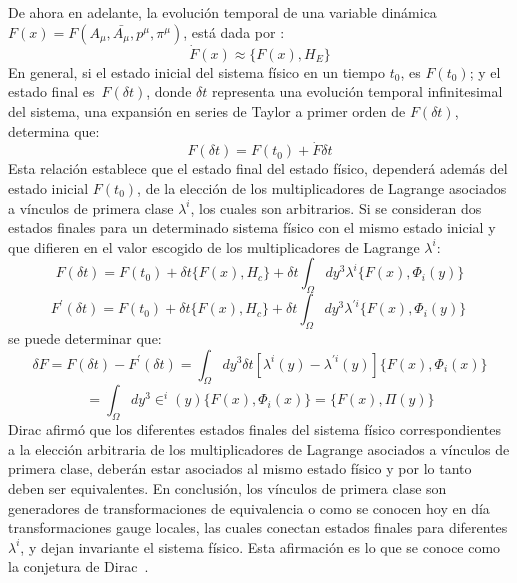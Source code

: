\documentclass[a4paper,12pt]{article}
\begin{document}
De ahora en adelante, la evolución temporal de una variable dinámica \mbox{$F(x)=F(A_\mu,\bar{A_\mu},p^\mu,\pi^\mu)$}, está dada por \cite{dirac,puebla,Merilin}:
\begin{equation}
\dot F(x)\approx\{F(x),H_E\} 
\label{haex}
\end{equation}
En general, si el estado inicial del sistema físico en un tiempo $t_0$, es $F(t_0)$; y el estado final \mbox{es $F(\delta t)$}, donde $\delta t$ representa una evolución temporal infinitesimal del sistema, una expansión en series de Taylor a primer orden de $F(\delta t)$, determina que:
\begin{equation}
F(\delta t)=F(t_0)+\dot F \delta t
\end{equation}
Esta relación establece que el estado final del estado físico, dependerá además del estado inicial $F(t_0)$, de la elección de los multiplicadores de Lagrange asociados a vínculos de primera clase $\lambda^i$, los cuales son arbitrarios. Si se consideran dos estados finales para un determinado sistema físico con el mismo estado inicial y que difieren en el valor escogido de los multiplicadores de Lagrange $\lambda^i$:
\begin{equation}
F(\delta t)=F(t_0)+\delta t\{F(x),H_c\}+\delta t\int_{\Omega}dy^3\lambda^i\{F(x),\Phi_i(y)\} 
\end{equation}
\begin{equation}
F^{'}(\delta t)=F(t_0)+\delta t\{F(x),H_c\}+\delta t\int_{\Omega}dy^3\lambda^{'i}\{F(x),\Phi_i(y)\}\ 
\end{equation}
se puede determinar que:
\begin{equation}
\delta F=F(\delta t)-F^{'}(\delta t)=\int_{\Omega}dy^3\delta t[\lambda^{i}(y)-\lambda^{'i}(y)]\{F(x),\Phi_i(x)\}
\end{equation}
$$=\int_{\Omega}dy^3\in^i(y)\{F(x),\Phi_i(x)\}=\{F(x),\Pi(y)\}$$
Dirac afirmó que los diferentes estados finales del sistema físico correspondientes a la elección arbitraria de los multiplicadores de Lagrange asociados a vínculos de primera clase, deberán estar asociados al mismo estado físico y por lo tanto deben ser equivalentes. En conclusión, los vínculos de primera clase son generadores de \mbox{transformaciones} de equivalencia o como se conocen hoy en día transformaciones gauge locales, las cuales conectan estados finales para \mbox{diferentes} $\lambda^{i}$, y \mbox{dejan} invariante el sistema físico. Esta afirmación es lo que se conoce como la conjetura de \mbox{Dirac \cite{dirac,puebla,Merilin}.}
\\
\end{document}

